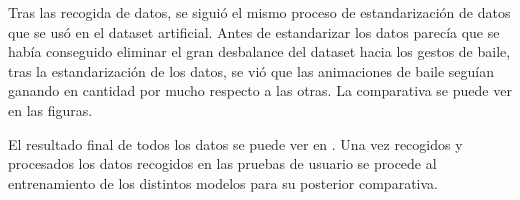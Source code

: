 Tras las recogida de datos, se siguió el mismo proceso de estandarización de datos que se usó en el dataset artificial. Antes de estandarizar los datos parecía que se había conseguido eliminar el gran desbalance del dataset hacia los gestos de baile, tras la estandarización de los datos, se vió que las animaciones de baile seguían ganando en cantidad por mucho respecto a las otras. La comparativa se puede ver en las figuras.

El resultado final de todos los datos se puede ver en \cite{csv-pose-animations}. Una vez recogidos y procesados los datos recogidos en las pruebas de usuario se procede al entrenamiento de los distintos modelos para su posterior comparativa.